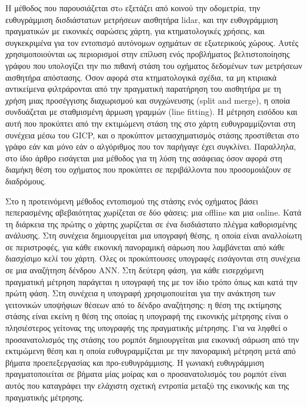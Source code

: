 Η μέθοδος που παρουσιάζεται στo \cite{Bresson2019a} εξετάζει από κοινού την
οδομετρία, την ευθυγράμμιση δισδιάστατων μετρήσεων αισθητήρα lidar, και την
ευθυγράμμιση πραγματικών με εικονικές σαρώσεις χάρτη, για κτηματολογικές
χρήσεις, και συγκεκριμένα για τον εντοπισμό αυτόνομων οχημάτων σε εξωτερικούς
χώρους. Αυτές χρησιμοποιούνται ως περιορισμοί στην επίλυση ενός προβλήματος
βελτιστοποίησης γράφου που υπολογίζει την πιο πιθανή στάση του οχήματος
δεδομένων των μετρήσεων αισθητήρα απόστασης. Όσον αφορά στα κτηματολογικά
σχέδια, τα μη κτιριακά αντικείμενα φιλτράρονται από την πραγματική παρατήρηση
του αισθητήρα με τη χρήση μιας προσέγγισης διαχωρισμού και συγχώνευσης (split
and merge), η οποία συνδυάζεται με σταθμισμένη άρμωση γραμμών (line fitting). Η
μέτρηση εισόδου και αυτή που προκύπτει από την εκτιμώμενη στάση της στο χάρτη
ευθυγραμμίζονται στη συνέχεια μέσω του GICP, και ο προκύπτον μετασχηματισμός
στάσης προστίθεται στο γράφο εάν και μόνο εάν ο αλγόριθμος που τον παρήγαγε
έχει συγκλίνει. Παραλληλα, στο ίδιο άρθρο εισάγεται μια μέθοδος για τη λύση της
ασάφειας όσον αφορά στη διαμήκη θέση του οχήματος που προκύπτει σε περιβάλλοντα
που προσομοιάζουν σε διαδρόμους.

Στο \cite{Wang2021a} η προτεινόμενη μέθοδος εντοπισμού της στάσης ενός
οχήματος βάσει πεπερασμένης αβεβαιότητας χωρίζεται σε δύο φάσεις: μια offline
και μια online. Κατά τη διάρκεια της πρώτης ο χάρτης χωρίζεται σε ένα
δισδιάστατο πλέγμα καθορισμένης ανάλυσης. Στη συνέχεια δημιουργείται μια
υπογραφή θέσης, η οποία είναι αναλλοίωτη σε περιστροφές, για κάθε εικονική
πανοραμική σάρωση που λαμβάνεται από κάθε διασχίσιμο κελί του χάρτη. Όλες οι
προκύπτουσες υπογραφές εισάγονται στη συνέχεια σε μια αναζήτηση δένδρου ANN.
Στη δεύτερη φάση, για κάθε εισερχόμενη πραγματική μέτρηση παράγεται η υπογραφή
της με τον ίδιο τρόπο όπως και κατά την πρώτη φάση. Στη συνέχεια η υπογραφή
χρησιμοποιείται για την ανάκτηση των γειτονικών υποψήφιων θέσεων από το δένδρο
αναζήτησης: η θέση της εκτίμησης στάσης είναι εκείνη η θέση της οποίας η
υπογραφή της εικονικής μέτρησης είναι ο πλησιέστερος γείτονας της υπογραφής της
πραγματικής μέτρησης.  Για να ληφθεί ο προσανατολισμός της στάσης του ρομπότ
δημιουργείται μια εικονική σάρωση από την εκτιμώμενη θέση και η οποία
ευθυγραμμίζεται με την πανοραμική μέτρηση μετά από βήματα προεπεξεργασίας και
προ-ευθυγράμμισης. Η γωνιακή ευθυγράμμιση πραγματοποιείται σε βήματα μίας
μοίρας και ο προσανατολισμός του ρομπότ είναι αυτός που καταγράφει την ελάχιστη
σχετική εντροπία μεταξύ της εικονικής και της πραγματικής μέτρησης.

